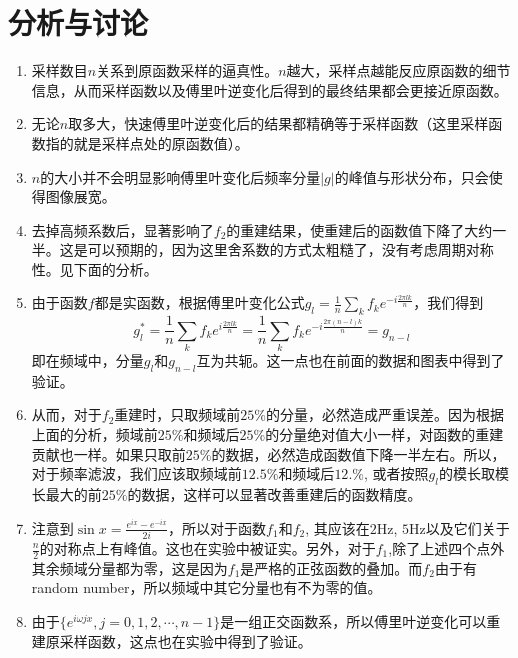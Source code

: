 \documentclass[english]{ctexart}
\begin{document}
\section{分析与讨论}
\begin{enumerate}
\item 采样数目$n$关系到原函数采样的逼真性。$n$越大，采样点越能反应原函数的细节信息，从而采样函数以及傅里叶逆变化后得到的最终结果都会更接近原函数。
\item 无论$n$取多大，快速傅里叶逆变化后的结果都精确等于采样函数（这里采样函数指的就是采样点处的原函数值）。
\item $n$的大小并不会明显影响傅里叶变化后频率分量$|g|$的峰值与形状分布，只会使得图像展宽。
\item 去掉高频系数后，显著影响了$f_{2}$的重建结果，使重建后的函数值下降了大约一半。这是可以预期的，因为这里舍系数的方式太粗糙了，没有考虑周期对称性。见下面的分析。
\item 由于函数$f$都是实函数，根据傅里叶变化公式$g_{l}=\frac{1}{n}\sum_{k}f_{k}e^{-i\frac{2\pi lk}{n}}$，我们得到
\begin{equation}
g_{l}^{*}=\frac{1}{n}\sum_{k}f_{k}e^{i\frac{2\pi lk}{n}}=\frac{1}{n}\sum_{k}f_{k}e^{-i\frac{2\pi(n-l)k}{n}}=g_{n-l}
\end{equation}
即在频域中，分量$g_{l}$和$g_{n-l}$互为共轭。这一点也在前面的数据和图表中得到了验证。
\item 从而，对于$f_{2}$重建时，只取频域前$25\%$的分量，必然造成严重误差。因为根据上面的分析，频域前$25\%$和频域后$25\%$的分量绝对值大小一样，对函数的重建贡献也一样。如果只取前$25\%$的数据，必然造成函数值下降一半左右。所以，对于频率滤波，我们应该取频域前$12.5\%$和频域后$12.\%$,
或者按照$g_{l}$的模长取模长最大的前$25\%$的数据，这样可以显著改善重建后的函数精度。
\item 注意到$\sin x=\frac{e^{ix}-e^{-ix}}{2i}$，所以对于函数$f_{1}$和$f_{2}$, 其应该在$2\mathrm{Hz}$,
$5\mathrm{Hz}$以及它们关于$\frac{n}{2}$的对称点上有峰值。这也在实验中被证实。另外，对于$f_{1}$,除了上述四个点外其余频域分量都为零，这是因为$f_{1}$是严格的正弦函数的叠加。而$f_{2}$由于有random
number，所以频域中其它分量也有不为零的值。
\item 由于$\{e^{i\omega jx},j=0,1,2,\cdots,n-1\}$是一组正交函数系，所以傅里叶逆变化可以重建原采样函数，这点也在实验中得到了验证。
\end{enumerate}
\end{document}
